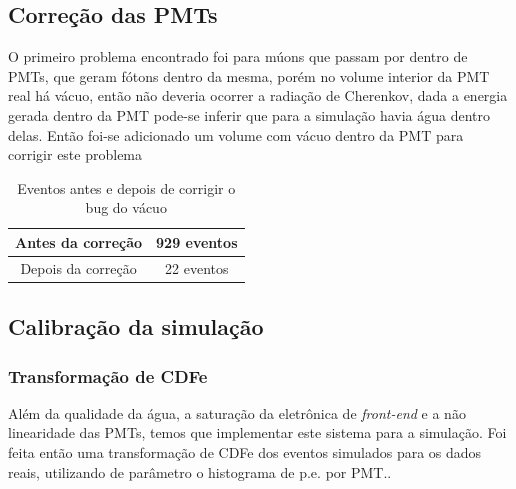 \subsection{Correção das PMTs}

O primeiro problema encontrado foi para múons que passam por dentro de PMTs, que geram fótons dentro da mesma, porém no volume interior da PMT real há vácuo, então não deveria ocorrer a radiação de Cherenkov, dada a energia gerada dentro da PMT pode-se inferir que para a simulação havia água dentro delas. Então foi-se adicionado um volume com vácuo dentro da PMT para corrigir este problema

\begin{table}[H]
	\centering
	\begin{tabular}{|c|c|}
		\hline
		Antes da correção  & 929 eventos \\ \hline
		Depois da correção & 22  eventos \\ \hline
	\end{tabular}

\caption{Eventos antes e depois de corrigir o bug do vácuo}
\end{table}

\subsection{Calibração da simulação}



\subsubsection{Transformação de CDFe}

Além da qualidade da água, a saturação da eletrônica de \emph{front-end} e a não linearidade das PMTs, temos que implementar este sistema para a simulação. Foi feita então uma transformação de \ac{CDFe} dos eventos simulados para os dados reais, utilizando de parâmetro o histograma de p.e. por PMT.. 


